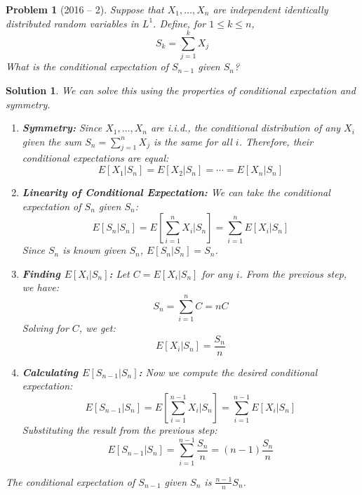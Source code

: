 \documentclass[12pt]{amsart}
\newtheorem{problem}{Problem}
\newtheorem*{solution}{Solution}
\begin{document}
\begin{problem}[2016 -- 2]
Suppose that $X_1, \ldots, X_n$ are independent identically distributed random variables in $L^1$. Define, for $1 \leq k \leq n$,
$$
S_k=\sum_{j=1}^k X_j
$$
What is the conditional expectation of $S_{n-1}$ given $S_n$?
\end{problem}
\begin{solution}
We can solve this using the properties of conditional expectation and symmetry.
\begin{enumerate}
    \item \textbf{Symmetry:} Since $X_1, \ldots, X_n$ are i.i.d., the conditional distribution of any $X_i$ given the sum $S_n = \sum_{j=1}^n X_j$ is the same for all $i$. Therefore, their conditional expectations are equal:
    $$ E[X_1 | S_n] = E[X_2 | S_n] = \cdots = E[X_n | S_n] $$

    \item \textbf{Linearity of Conditional Expectation:} We can take the conditional expectation of $S_n$ given $S_n$:
    $$ E[S_n | S_n] = E\left[\sum_{i=1}^n X_i \bigg| S_n\right] = \sum_{i=1}^n E[X_i | S_n] $$
    Since $S_n$ is known given $S_n$, $E[S_n | S_n] = S_n$.

    \item \textbf{Finding $E[X_i | S_n]$:} Let $C = E[X_i | S_n]$ for any $i$. From the previous step, we have:
    $$ S_n = \sum_{i=1}^n C = nC $$
    Solving for $C$, we get:
    $$ E[X_i | S_n] = \frac{S_n}{n} $$

    \item \textbf{Calculating $E[S_{n-1} | S_n]$:} Now we compute the desired conditional expectation:
    $$ E[S_{n-1} | S_n] = E\left[\sum_{i=1}^{n-1} X_i \bigg| S_n\right] = \sum_{i=1}^{n-1} E[X_i | S_n] $$
    Substituting the result from the previous step:
    $$ E[S_{n-1} | S_n] = \sum_{i=1}^{n-1} \frac{S_n}{n} = (n-1) \frac{S_n}{n} $$
\end{enumerate}
The conditional expectation of $S_{n-1}$ given $S_n$ is $\frac{n-1}{n}S_n$.
\end{solution}
\end{document}

